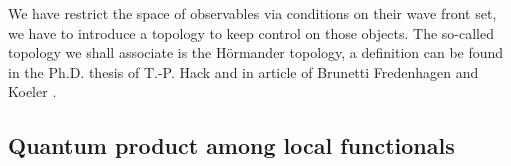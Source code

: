 \documentclass[11pt]{book}
\theoremstyle{break}
\begin{document}
\bigskip


We have restrict the space of observables via conditions on their wave front set, we have to introduce a topology to keep control on those objects. The so-called topology we shall associate is the Hörmander topology, a definition can be found in the Ph.D. thesis of T.-P. Hack \cite[Chapter III]{HACK_2010} and in article of Brunetti Fredenhagen and Koeler \cite{BFK_1996}.


\subsection{Quantum product among local functionals}
\end{document}
